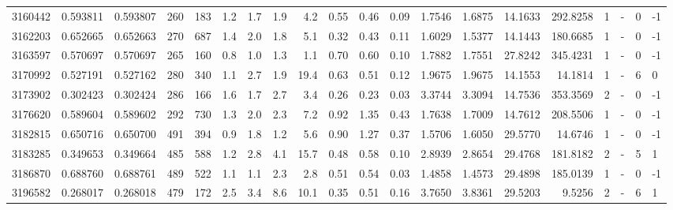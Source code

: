 \begin{tabular}{rrrrrrrrrrrrrrrrrlrl}
   3160442 & 0.593811 &   0.593807 &  260 &  183 &      1.2 &      1.7 &     1.9 &      4.2 &       0.55 &        0.46 &        0.09 &  1.7546 &  1.6875 &   14.1633 &  292.8258 &       1 &             - &        0 &        -1 \\
   3162203 & 0.652665 &   0.652663 &  270 &  687 &      1.4 &      2.0 &     1.8 &      5.1 &       0.32 &        0.43 &        0.11 &  1.6029 &  1.5377 &   14.1443 &  180.6685 &       1 &             - &        0 &        -1 \\
   3163597 & 0.570697 &   0.570697 &  265 &  160 &      0.8 &      1.0 &     1.3 &      1.1 &       0.70 &        0.60 &        0.10 &  1.7882 &  1.7551 &   27.8242 &  345.4231 &       1 &             - &        0 &        -1 \\
   3170992 & 0.527191 &   0.527162 &  280 &  340 &      1.1 &      2.7 &     1.9 &     19.4 &       0.63 &        0.51 &        0.12 &  1.9675 &  1.9675 &   14.1553 &   14.1814 &       1 &             - &        6 &         0 \\
   3173902 & 0.302423 &   0.302424 &  286 &  166 &      1.6 &      1.7 &     2.7 &      3.4 &       0.26 &        0.23 &        0.03 &  3.3744 &  3.3094 &   14.7536 &  353.3569 &       2 &             - &        0 &        -1 \\
   3176620 & 0.589604 &   0.589602 &  292 &  730 &      1.3 &      2.0 &     2.3 &      7.2 &       0.92 &        1.35 &        0.43 &  1.7638 &  1.7009 &   14.7612 &  208.5506 &       1 &             - &        0 &        -1 \\
   3182815 & 0.650716 &   0.650700 &  491 &  394 &      0.9 &      1.8 &     1.2 &      5.6 &       0.90 &        1.27 &        0.37 &  1.5706 &  1.6050 &   29.5770 &   14.6746 &       1 &             - &        0 &        -1 \\
   3183285 & 0.349653 &   0.349664 &  485 &  588 &      1.2 &      2.8 &     4.1 &     15.7 &       0.48 &        0.58 &        0.10 &  2.8939 &  2.8654 &   29.4768 &  181.8182 &       2 &             - &        5 &         1 \\
   3186870 & 0.688760 &   0.688761 &  489 &  522 &      1.1 &      1.1 &     2.3 &      2.8 &       0.51 &        0.54 &        0.03 &  1.4858 &  1.4573 &   29.4898 &  185.0139 &       1 &             - &        0 &        -1 \\
   3196582 & 0.268017 &   0.268018 &  479 &  172 &      2.5 &      3.4 &     8.6 &     10.1 &       0.35 &        0.51 &        0.16 &  3.7650 &  3.8361 &   29.5203 &    9.5256 &       2 &             - &        6 &         1 \\

\end{tabular}
